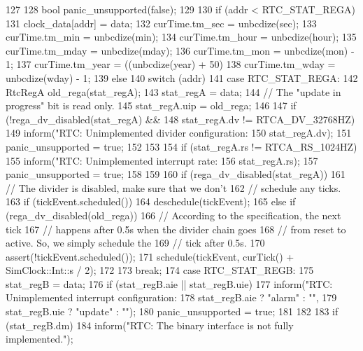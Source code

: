 \begin{DoxyCode}
127 {
128     bool panic_unsupported(false);
129 
130     if (addr < RTC_STAT_REGA) {
131         clock_data[addr] = data;
132         curTime.tm_sec = unbcdize(sec);
133         curTime.tm_min = unbcdize(min);
134         curTime.tm_hour = unbcdize(hour);
135         curTime.tm_mday = unbcdize(mday);
136         curTime.tm_mon = unbcdize(mon) - 1;
137         curTime.tm_year = ((unbcdize(year) + 50) %
138         curTime.tm_wday = unbcdize(wday) - 1;
139     } else {
140         switch (addr) {
141           case RTC_STAT_REGA: {
142               RtcRegA old_rega(stat_regA);
143               stat_regA = data;
144               // The "update in progress" bit is read only.
145               stat_regA.uip = old_rega;
146 
147               if (!rega_dv_disabled(stat_regA) &&
148                   stat_regA.dv != RTCA_DV_32768HZ) {
149                   inform("RTC: Unimplemented divider configuration: %
150                         stat_regA.dv);
151                   panic_unsupported = true;
152               }
153 
154               if (stat_regA.rs != RTCA_RS_1024HZ) {
155                   inform("RTC: Unimplemented interrupt rate: %
156                         stat_regA.rs);
157                   panic_unsupported = true;
158               }
159 
160               if (rega_dv_disabled(stat_regA)) {
161                   // The divider is disabled, make sure that we don't
162                   // schedule any ticks.
163                   if (tickEvent.scheduled())
164                       deschedule(tickEvent);
165               } else if (rega_dv_disabled(old_rega))  {
166                   // According to the specification, the next tick
167                   // happens after 0.5s when the divider chain goes
168                   // from reset to active. So, we simply schedule the
169                   // tick after 0.5s.
170                   assert(!tickEvent.scheduled());
171                   schedule(tickEvent, curTick() + SimClock::Int::s / 2);
172               }
173           } break;
174           case RTC_STAT_REGB:
175             stat_regB = data;
176             if (stat_regB.aie || stat_regB.uie) {
177                 inform("RTC: Unimplemented interrupt configuration: %
178                       stat_regB.aie ? "alarm" : "",
179                       stat_regB.uie ? "update" : "");
180                 panic_unsupported = true;
181             }
182 
183             if (stat_regB.dm) {
184                 inform("RTC: The binary interface is not fully implemented.\n");
}}}}
\end{DoxyCode}
